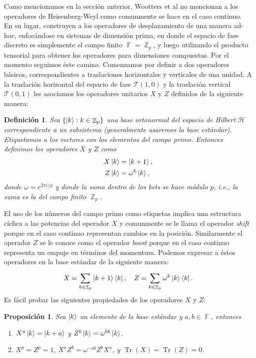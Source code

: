 \documentclass[a4paper,11pt]{report}
\DeclareMathOperator{\Z}{\mathbb{Z}}
\DeclareMathOperator{\F}{\mathbb{F}}
\DeclareMathOperator{\Tr}{Tr}
\newtheorem{definition}{Definición}
\newtheorem{proposition}{Proposición}
\begin{document}
  Como mencionamos en la sección anterior, Wootters et al no
  mencionan a los operadores de Heisenberg-Weyl como
  comunmente se hace en el caso continuo. En su lugar,
  construyen a los operadores de desplazamiento de una
  manera ad-hoc, enfocándose en sistemas de dimensión prima,
  en donde el espacio de fase discreto es simplemente el
  campo finito $\F = \Z_p$, y luego utilizando el producto
  tensorial para obtener los operadores para dimensiones
  compuestas. Por el momento seguimos éste camino.
  Comenzamos por definir a dos operadores básicos,
  correspondientes a traslaciones horizontales y verticales
  de una unidad. A la traslación horizontal del espacio de
  fase $\mathcal T(1,0)$ y la traslación vertical $\mathcal
  T(0,1)$ les asociamos los operadores unitarios $X$ y $Z$
  definidos de la siguiente manera:
  \begin{definition}
    Sea $\{\ket k : k \in \Z_p\}$ una base ortonormal del
    espacio de Hilbert $\mathcal H$ correspondiente a un
    subsistema (generalmente usaremos la base estándar).
    Etiquetamos a los vectores con los elementos del campo
    primo. Entonces definimos los operadores $X$ y $Z$ como
    \begin{align}
      X \ket k
      &= \ket{k + 1}, \\
      Z \ket k
      &= \omega^{k} \ket k,
    \end{align}
    donde $\omega = e^{2\pi i / p}$ y donde la suma dentro
    de los kets se hace módulo $p$, i.e., la suma es la del
    campo finito $\Z_p$.
  \end{definition}
  El uso de los números del campo primo como etiquetas
  implica una estructura cíclica a las potencias del
  operador $X$ y comunmente se le llama el operador
  \textit{shift} porque en el caso continuo representan
  cambios en la posición. Similarmente el operador $Z$ se le
  conoce como el operador \textit{boost} porque en el caso
  continuo representa un empuje en términos del momentum.
  Podemos expresar a éstos operadores en la base
  estándar de la siguiente manera:
  \begin{equation}
    X = \sum_{k \in \Z_p}^{} \ket{k+1}\bra{k}, \\
    \quad
    Z = \sum_{k \in \Z_p}^{} \omega^{k} \ket k \bra k.
  \end{equation}
  Es fácil probar las siguientes propiedades de los
  operadores $X$ y $Z$:
  \begin{proposition}
    \label{prop:prime_XZ_props}
    Sea $\ket k$ un elemento de la base estándar y $a,b \in
    \F$, entonces
    \begin{enumerate}
      \item $X^{a} \ket{k} = \ket{k+a}$ y $Z^{b} \ket{k} =
        \omega^{b k} \ket{k}$.
      \item $X^{p} = Z^{p} = 1$, $X^{a} Z^{b} = \omega^{-ab}
        Z^{b} X^{a}$, y $\Tr(X) = \Tr(Z) = 0$.
    \end{enumerate}
  \end{proposition}
   
\end{document}
